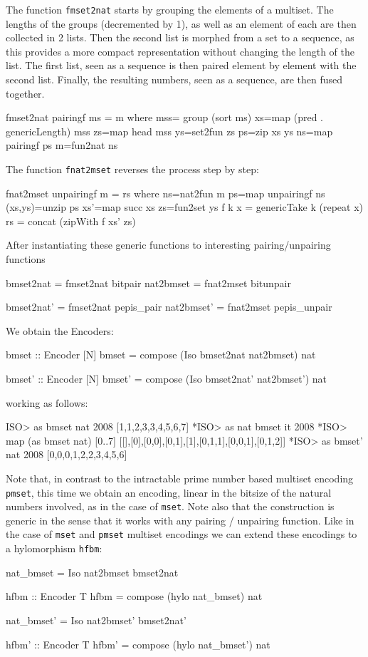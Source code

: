 \documentclass[]{INCLUDES/llncs}
\begin{document}
The function {\tt fmset2nat} starts by grouping the elements of a multiset. The
lengths of the groups (decremented by 1), as well as an element of each are then
collected in 2 lists. Then the second list is morphed
from a set to a sequence, as this provides a more compact representation without
changing the length of the list. The first list, seen as a sequence is then
paired element by element with the second list. 
Finally, the resulting numbers, seen as a sequence, are then fused together. 
\begin{code}
fmset2nat pairingf ms = m where  
  mss= group (sort ms) 
  xs=map (pred . genericLength) mss
  zs=map head mss
  ys=set2fun zs
  ps=zip xs ys
  ns=map pairingf ps 
  m=fun2nat ns
\end{code}
The function {\tt fnat2mset} reverses the process step by step:
\begin{code}
fnat2mset unpairingf m = rs where
   ns=nat2fun m
   ps=map unpairingf ns
   (xs,ys)=unzip ps
   xs'=map succ xs
   zs=fun2set ys
   f k x = genericTake k (repeat x) 
   rs = concat (zipWith f xs' zs)
\end{code}
After instantiating these generic functions to interesting pairing/unpairing
functions
\begin{code}
bmset2nat = fmset2nat bitpair
nat2bmset = fnat2mset bitunpair

bmset2nat' = fmset2nat pepis_pair
nat2bmset' = fnat2mset pepis_unpair
\end{code}
We obtain the Encoders:
\begin{code}
bmset :: Encoder [N]
bmset = compose (Iso bmset2nat nat2bmset) nat

bmset' :: Encoder [N]
bmset' = compose (Iso bmset2nat' nat2bmset') nat
\end{code}
working as follows:
\begin{codex}
ISO> as bmset nat 2008
[1,1,2,3,3,4,5,6,7]
*ISO> as nat bmset it
2008
*ISO> map (as bmset nat) [0..7]
[[],[0],[0,0],[0,1],[1],[0,1,1],[0,0,1],[0,1,2]]
*ISO> as bmset' nat 2008
[0,0,0,1,2,2,3,4,5,6]
\end{codex}
Note that, in contrast to the intractable prime number based multiset encoding
{\tt pmset}, this time we obtain an encoding, linear in the
bitsize of the natural numbers involved, as in the case of {\tt mset}.
Note also that the construction is generic in the sense that it works with any
pairing / unpairing function.
Like in the case of {\tt mset} and {\tt pmset} multiset encodings we can extend
these encodings to a hylomorphism {\tt hfbm}:
\begin{code}
nat_bmset = Iso nat2bmset bmset2nat

hfbm :: Encoder T
hfbm = compose (hylo nat_bmset) nat

nat_bmset' = Iso nat2bmset' bmset2nat'

hfbm' :: Encoder T
hfbm' = compose (hylo nat_bmset') nat
\end{code}
\end{document}
